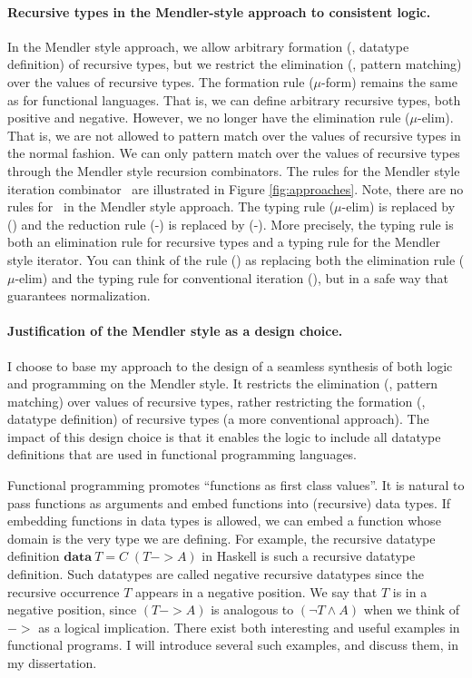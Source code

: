 \paragraph{Recursive types in the Mendler-style approach to consistent logic.}
In the Mendler style approach, we allow arbitrary formation
(\ie, datatype definition) of recursive types, but we restrict
the elimination (\ie, pattern matching) over the values of recursive types. 
The formation rule {\small($\mu$-form)} remains the same as
for functional languages. That is, we can define arbitrary recursive types,
both positive and negative. However, we no longer have the elimination
rule {\small($\mu$-elim)}. That is, we are not allowed to pattern match over
the values of recursive types in the normal fashion. We can only pattern match
over the values of recursive types through the Mendler style recursion
combinators. The rules for the Mendler style iteration combinator \MIt\
are illustrated in Figure \ref{fig:approaches}.
Note, there are no rules for \unIn\ in the Mendler style approach.
The typing rule {\small($\mu$-elim)} is replaced by {\small(\MIt)} and
the reduction rule {\small(\unIn-\In)} is replaced by {\small(\MIt-\In)}.
More precisely, the typing rule {\small \MIt} is both an elimination rule
for recursive types and a typing rule for the Mendler style iterator.
You can think of the rule {\small(\MIt)} as replacing both the elimination rule
{\small($\mu$-elim)} and the typing rule for conventional iteration
{\small(\It)}, but in a safe way that guarantees normalization.

\paragraph{Justification of the Mendler style as a design choice.}
I choose to base my approach to the design of a seamless synthesis of both
logic and programming on the Mendler style. It restricts the elimination (\ie,
pattern matching) over values of recursive types, rather restricting the
formation (\ie, datatype definition) of recursive types (a more conventional
approach). The impact of this design choice is that it enables the logic to
include all datatype definitions that are used in functional programming
languages.

Functional programming promotes ``functions as first class values''.
It is natural to pass functions as arguments and embed functions into
(recursive) data types. If embedding functions in data types is allowed,
we can embed a function whose domain is the very type we are defining.
For example, the recursive datatype definition
$\mathbf{data}~T = C\;(T -> \textit{A})$ in Haskell is such a recursive
datatype definition. Such datatypes are called negative recursive datatypes
since the recursive occurrence $T$ appears in a negative position.
We say that $T$ is in a negative position, since $(T -> A)$ is analogous to
$(\neg T \land A)$ when we think of $->$ as a logical implication. There exist
both interesting and useful examples in functional programs. I will
introduce several such examples, and discuss them, in my dissertation.

